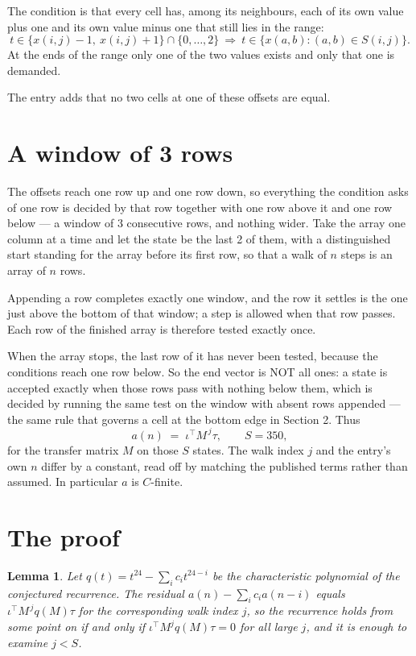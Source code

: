 \documentclass[11pt,a4paper]{article}
\theoremstyle{plain}
\newtheorem{lemma}[theorem]{Lemma}
\theoremstyle{definition}
\begin{document}
The condition is that every cell has, among its neighbours, each of its own value plus one and its own value minus one that still lies in the range:
\[
t\in\{x(i,j)-1,\ x(i,j)+1\}\cap\{0,\dots,2\}\ \Longrightarrow\ t\in\{x(a,b):(a,b)\in S(i,j)\}.
\]
At the ends of the range only one of the two values exists and only that one is demanded.

The entry adds that no two cells at one of these offsets are equal.

\section{A window of 3 rows}

The offsets reach one row up and one row down, so everything the condition asks of one row is
decided by that row together with one row above it and one row below --- a window of
$3$ consecutive rows, and nothing wider. Take the array one column at a time and
let the state be the last 2 of them, with a distinguished start standing for the array before its
first row, so that a walk of $n$ steps is an array of $n$ rows.

Appending a row completes exactly one window, and the row it settles is the one just above the bottom of that window; a step is
allowed when that row passes. Each row of the finished array is therefore tested exactly once.

When the array stops, the last row of it has never been tested, because the
conditions reach one row below. So the end vector is NOT all ones: a state is accepted exactly when
those rows pass with nothing below them, which is decided by running the same test on the window
with absent rows appended --- the same rule that governs a cell at the bottom edge in
Section 2.
Thus
\[
a(n)\;=\;\iota^{\!\top}M^{\,j}\tau ,\qquad S=350,
\]
for the transfer matrix $M$ on those $S$ states. The walk index $j$ and the entry's own $n$
differ by a constant, read off by matching the published terms rather than assumed. In
particular $a$ is $C$-finite.

\section{The proof}

\begin{lemma}\label{lem:crit}
Let $q(t)=t^{24}-\sum_i c_it^{24-i}$ be the characteristic polynomial of the
conjectured recurrence. The residual $a(n)-\sum_ic_ia(n-i)$ equals
$\iota^{\!\top}M^{\,j}q(M)\tau$ for the corresponding walk index $j$, so the recurrence
holds from some point on if and only if $\iota^{\!\top}M^{j}q(M)\tau=0$ for all large $j$,
and it is enough to examine $j<S$.
\end{lemma}
\end{document}
